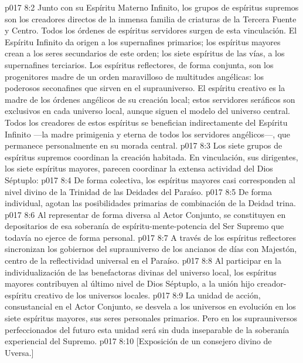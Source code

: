 \vs p017 8:2 \pc Junto con su Espíritu Materno Infinito, los grupos de espíritus supremos son los creadores directos de la inmensa familia de criaturas de la Tercera Fuente y Centro. Todos los órdenes de espíritus servidores surgen de esta vinculación. El Espíritu Infinito da origen a los supernafines primarios; los espíritus mayores crean a los seres secundarios de este orden; los siete espíritus de las vías, a los supernafines terciarios. Los espíritus reflectores, de forma conjunta, son los progenitores madre de un orden maravilloso de multitudes angélicas: los poderosos seconafines que sirven en el suprauniverso. El espíritu creativo es la madre de los órdenes angélicos de su creación local; estos servidores seráficos son exclusivos en cada universo local, aunque siguen el modelo del universo central. Todos los creadores de estos espíritus se benefician indirectamente del Espíritu Infinito ---la madre primigenia y eterna de todos los servidores angélicos---, que permanece personalmente en su morada central.
\vs p017 8:3 \pc Los siete grupos de espíritus supremos coordinan la creación habitada. En vinculación, sus dirigentes, los siete espíritus mayores, parecen coordinar la extensa actividad del Dios Séptuplo:
\vs p017 8:4 De forma colectiva, los espíritus mayores casi corresponden al nivel divino de la Trinidad de las Deidades del Paraíso.
\vs p017 8:5 De forma individual, agotan las posibilidades primarias de combinación de la Deidad trina.
\vs p017 8:6 Al representar de forma diversa al Actor Conjunto, se constituyen en depositarios de esa soberanía de espíritu\hyp{}mente\hyp{}potencia del Ser Supremo que todavía no ejerce de forma personal.
\vs p017 8:7 A través de los espíritus reflectores sincronizan los gobiernos del suprauniverso de los ancianos de días con Majestón, centro de la reflectividad universal en el Paraíso.
\vs p017 8:8 Al participar en la individualización de las benefactoras divinas del universo local, los espíritus mayores contribuyen al último nivel de Dios Séptuplo, a la unión hijo creador\hyp{}espíritu creativo de los universos locales.
\vs p017 8:9 \pc La unidad de acción, consustancial en el Actor Conjunto, se desvela a los universos en evolución en los siete espíritus mayores, sus seres personales primarios. Pero en los suprauniversos perfeccionados del futuro esta unidad será sin duda inseparable de la soberanía experiencial del Supremo.
\vsetoff
\vs p017 8:10 [Exposición de un consejero divino de Uversa.]

